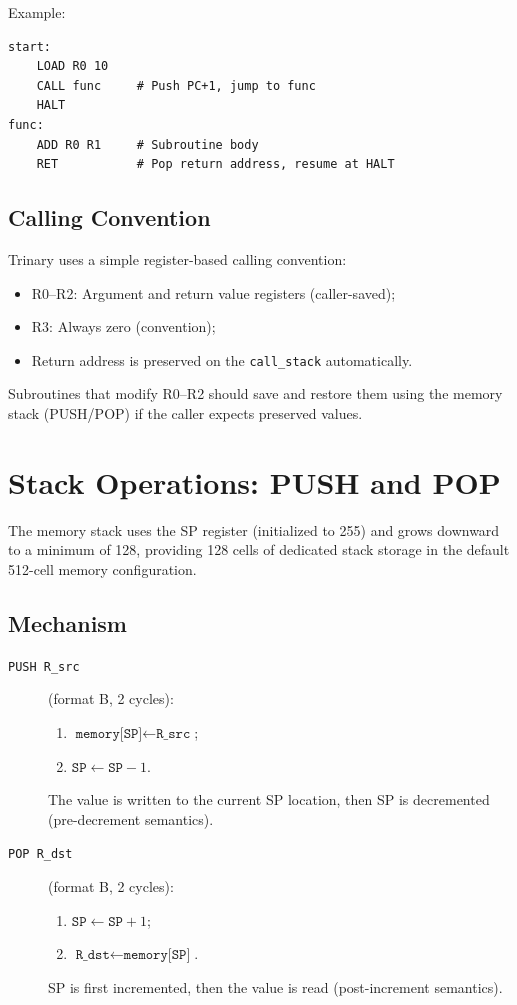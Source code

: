 \documentclass[10pt,a4paper,twoside]{book}
\begin{document}
Example:
\begin{lstlisting}
start:
    LOAD R0 10
    CALL func     # Push PC+1, jump to func
    HALT
func:
    ADD R0 R1     # Subroutine body
    RET           # Pop return address, resume at HALT
\end{lstlisting}

\section{Calling Convention}

Trinary uses a simple register-based calling convention:
\begin{itemize}
    \item R0--R2: Argument and return value registers (caller-saved);
    \item R3: Always zero (convention);
    \item Return address is preserved on the \texttt{call\_stack} automatically.
\end{itemize}
Subroutines that modify R0--R2 should save and restore them using the memory stack
(PUSH/POP) if the caller expects preserved values.

\chapter{Stack Operations: PUSH and POP}
\label{ch:stack}

The memory stack uses the SP register (initialized to 255) and grows downward to a
minimum of 128, providing 128 cells of dedicated stack storage in the default 512-cell
memory configuration.

\section{Mechanism}

\begin{description}
    \item[\texttt{PUSH R\_src}] (format B, 2 cycles):
          \begin{enumerate}
              \item $\texttt{memory[SP]} \gets \texttt{R\_src}$;
              \item $\texttt{SP} \gets \texttt{SP} - 1$.
          \end{enumerate}
          The value is written to the current SP location, then SP is decremented
          (pre-decrement semantics).
    \item[\texttt{POP R\_dst}] (format B, 2 cycles):
          \begin{enumerate}
              \item $\texttt{SP} \gets \texttt{SP} + 1$;
              \item $\texttt{R\_dst} \gets \texttt{memory[SP]}$.
          \end{enumerate}
          SP is first incremented, then the value is read (post-increment semantics).
\end{description}
\end{document}
